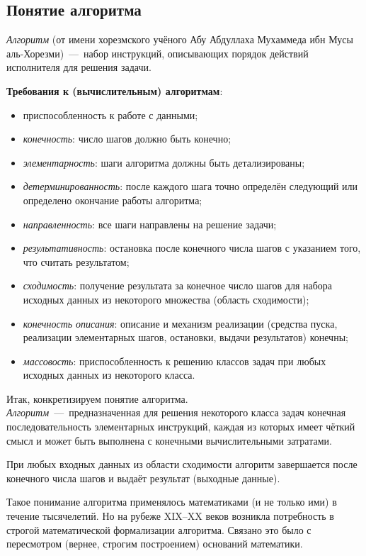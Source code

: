\subsection{Понятие алгоритма}
\textit{Алгоритм} (от имени хорезмского учёного Абу Абдуллаха Мухаммеда ибн Мусы аль-Хорезми)~---~набор инструкций, описывающих порядок действий исполнителя для решения задачи.

\textbf{Требования к (вычислительным) алгоритмам}:
\begin{itemize}
    \item приспособленность к работе с данными;
    \item \textit{конечность}: число шагов должно быть конечно;
    \item \textit{элементарность}: шаги алгоритма должны быть детализированы;
    \item \textit{детерминированность}: после каждого шага точно определён следующий или определено окончание работы алгоритма;
    \item \textit{направленность}: все шаги направлены на решение задачи;
    \item \textit{результативность}: остановка после конечного числа шагов с указанием того, что считать результатом;
    \item \textit{сходимость}: получение результата за конечное число шагов для набора исходных данных из некоторого множества (область сходимости);
    \item \textit{конечность описания}: описание и механизм реализации (средства пуска, реализации элементарных шагов, остановки, выдачи результатов) конечны;
    \item \textit{массовость}: приспособленность к решению классов задач при любых исходных данных из некоторого класса.
\end{itemize}

Итак, конкретизируем понятие алгоритма. \\
\textit{Алгоритм}~---~предназначенная для решения некоторого класса задач конечная последовательность элементарных инструкций, каждая из которых имеет чёткий смысл и может быть выполнена с конечными вычислительными затратами.

При любых входных данных из области сходимости алгоритм завершается после конечного числа шагов и выдаёт результат (выходные данные).

Такое понимание алгоритма применялось математиками (и не только ими) в течение тысячелетий. Но на рубеже XIX--XX веков возникла потребность в строгой математической формализации алгоритма. Связано это было с пересмотром (вернее, строгим построением) оснований математики.

